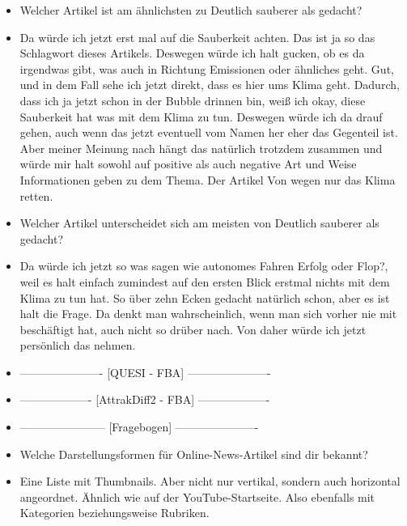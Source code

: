{\begin{itemize}[]
            \item {} Welcher Artikel ist am ähnlichsten zu \flqq Deutlich sauberer als gedacht\frqq{}?
            \item {} Da würde ich jetzt erst mal auf die Sauberkeit achten.
                  Das ist ja so das Schlagwort dieses Artikels.
                  Deswegen würde ich halt gucken, ob es da irgendwas gibt, was auch in Richtung Emissionen oder ähnliches geht.
                  Gut, und in dem Fall sehe ich jetzt direkt, dass es hier ums Klima geht.
                  Dadurch, dass ich ja jetzt schon in der Bubble drinnen bin, weiß ich okay, diese Sauberkeit hat was mit dem Klima zu tun.
                  Deswegen würde ich da drauf gehen, auch wenn das jetzt eventuell vom Namen her eher das Gegenteil ist.
                  Aber meiner Meinung nach hängt das natürlich trotzdem zusammen und würde mir halt sowohl auf positive als auch negative Art und Weise Informationen geben zu dem Thema.
                  Der Artikel \flqq Von wegen nur das Klima retten\frqq{}.
            \item {} Welcher Artikel unterscheidet sich am meisten von \flqq Deutlich sauberer als gedacht\frqq{}?
            \item {} Da würde ich jetzt so was sagen wie \flqq autonomes Fahren Erfolg oder Flop?\frqq{}, weil es halt einfach zumindest auf den ersten Blick erstmal nichts mit dem Klima zu tun hat.
                  So über zehn Ecken gedacht natürlich schon, aber es ist halt die Frage.
                  Da denkt man wahrscheinlich, wenn man sich vorher nie mit beschäftigt hat, auch nicht so drüber nach.
                  Von daher würde ich jetzt persönlich das nehmen.
            \item {----------------------} [QUESI - FBA] {----------------------}
            \item {-------------------} [AttrakDiff2 - FBA] {-------------------}
            \item {-----------------------} [Fragebogen] {----------------------}
            \item {} Welche Darstellungsformen für Online-News-Artikel sind dir bekannt?
            \item {} Eine Liste mit Thumbnails.
                  Aber nicht nur vertikal, sondern auch horizontal angeordnet.
                  Ähnlich wie auf der YouTube-Startseite.
                  Also ebenfalls mit Kategorien beziehungsweise Rubriken.

\end{itemize}}
